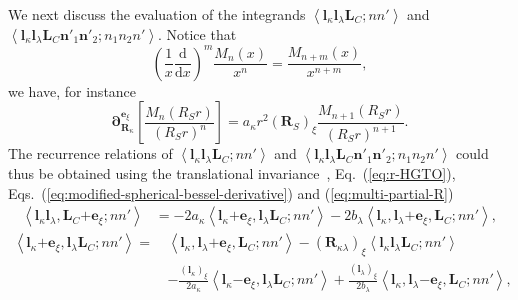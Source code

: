 \documentclass[a4paper,11pt,twoside,openright]{book}
\begin{document}
We next discuss the evaluation of the integrands $\left\langle\boldsymbol{l}_{\kappa}\boldsymbol{l}_{\lambda}\boldsymbol{L}_{C};nn'\right\rangle$
and $\left\langle\boldsymbol{l}_{\kappa}\boldsymbol{l}_{\lambda}\boldsymbol{L}_{C}%
\boldsymbol{n}'_{1}\boldsymbol{n}'_{2};n_{1}n_{2}n'\right\rangle$. Notice that~\cite{Abramowitz:1972}
\begin{equation}
  \left(\frac{1}{x}\frac{\mathrm{d}}{\mathrm{d}{x}}\right)^{m}\frac{M_{n}(x)}{x^n}
  =\frac{M_{n+m}(x)}{x^{n+m}},
\end{equation}
we have, for instance
\begin{equation}
  \label{eq:modified-spherical-bessel-derivative}
  \boldsymbol{\partial}_{\boldsymbol{R}_{\kappa}}^{\boldsymbol{e}_{\xi}}\left[\frac{M_{n}(R_{S}r)}{(R_{S}r)^{n}}\right]
  =a_{\kappa}r^2(\boldsymbol{R}_{S})_{\xi}\frac{M_{n+1}(R_{S}r)}{(R_{S}r)^{n+1}}.
\end{equation}
The recurrence relations of $\left\langle\boldsymbol{l}_{\kappa}\boldsymbol{l}_{\lambda}\boldsymbol{L}_{C};nn'\right\rangle$
and $\left\langle\boldsymbol{l}_{\kappa}\boldsymbol{l}_{\lambda}\boldsymbol{L}_{C}%
\boldsymbol{n}'_{1}\boldsymbol{n}'_{2};n_{1}n_{2}n'\right\rangle$ could thus be obtained using
the translational invariance~\cite{Komornicki:CPL45:595,Kahn:JCP75:3962}, Eq.~(\ref{eq:r-HGTO}),
Eqs.~(\ref{eq:modified-spherical-bessel-derivative}) and (\ref{eq:multi-partial-R})
\begin{align}
  \left\langle\boldsymbol{l}_{\kappa}\boldsymbol{l}_{\lambda},%
    \boldsymbol{L}_{C}\mathrm{+}\boldsymbol{e}_{\xi};nn'\right\rangle
  &=-2a_{\kappa}\left\langle\boldsymbol{l}_{\kappa}\mathrm{+}\boldsymbol{e}_{\xi},%
    \boldsymbol{l}_{\lambda}\boldsymbol{L}_{C};nn'\right\rangle%
  -2b_{\lambda}\left\langle\boldsymbol{l}_{\kappa},%
    \boldsymbol{l}_{\lambda}\mathrm{+}\boldsymbol{e}_{\xi},\boldsymbol{L}_{C};nn'\right\rangle,
\end{align}
%
\begin{align}
  \left\langle\boldsymbol{l}_{\kappa}\mathrm{+}\boldsymbol{e}_{\xi},%
    \boldsymbol{l}_{\lambda}\boldsymbol{L}_{C};nn'\right\rangle
  =\,&\left\langle\boldsymbol{l}_{\kappa},%
    \boldsymbol{l}_{\lambda}\mathrm{+}\boldsymbol{e}_{\xi},\boldsymbol{L}_{C};nn'\right\rangle
  -(\boldsymbol{R}_{\kappa\lambda})_{\xi}%
    \left\langle\boldsymbol{l}_{\kappa}\boldsymbol{l}_{\lambda}\boldsymbol{L}_{C};nn'\right\rangle\\
  &-\frac{(\boldsymbol{l}_{\kappa})_{\xi}}{2a_{\kappa}}%
    \left\langle\boldsymbol{l}_{\kappa}\mathrm{-}\boldsymbol{e}_{\xi},%
    \boldsymbol{l}_{\lambda}\boldsymbol{L}_{C};nn'\right\rangle
  +\frac{(\boldsymbol{l}_{\lambda})_{\xi}}{2b_{\lambda}}%
    \left\langle\boldsymbol{l}_{\kappa},\boldsymbol{l}_{\lambda}\mathrm{-}\boldsymbol{e}_{\xi},%
    \boldsymbol{L}_{C};nn'\right\rangle,\nonumber
\end{align}
\end{document}
